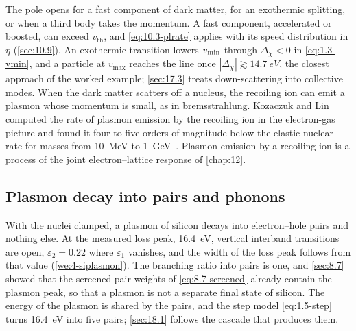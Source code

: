 The pole opens for a fast component of dark matter, for an exothermic splitting, or when a third body takes the momentum. A fast component, accelerated or boosted, can exceed $v_{\mathrm{th}}$, and \cref{eq:10.3-plrate} applies with its speed distribution in $\eta$ (\cref{sec:10.9}). An exothermic transition lowers $v_{\mathrm{min}}$ through $\Delta_\chi < 0$ in \cref{eq:1.3-vmin}, and a particle at $v_{\mathrm{max}}$ reaches the line once $|\Delta_\chi| \gtrsim \SI{14.7}{eV}$, the closest approach of the worked example; \cref{sec:17.3} treats down-scattering into collective modes. When the dark matter scatters off a nucleus, the recoiling ion can emit a plasmon whose momentum is small, as in bremsstrahlung. Kozaczuk and Lin computed the rate of plasmon emission by the recoiling ion in the electron-gas picture and found it four to five orders of magnitude below the elastic nuclear rate for masses from \SI{10}{MeV} to \SI{1}{GeV}~\cite{kozaczuk2020plasmon}. Plasmon emission by a recoiling ion is a process of the joint electron--lattice response of \cref{chap:12}.

\subsection{Plasmon decay into pairs and phonons}\label{sec:10.3-decay}

With the nuclei clamped, a plasmon of silicon decays into electron--hole pairs and nothing else. At the measured loss peak, \SI{16.4}{eV}, vertical interband transitions are open, $\varepsilon_2 = 0.22$ where $\varepsilon_1$ vanishes, and the width of the loss peak follows from that value (\cref{we:4-siplasmon}). The branching ratio into pairs is one, and \cref{sec:8.7} showed that the screened pair weights of \cref{eq:8.7-screened} already contain the plasmon peak, so that a plasmon is not a separate final state of silicon. The energy of the plasmon is shared by the pairs, and the step model \cref{eq:1.5-step} turns \SI{16.4}{eV} into five pairs; \cref{sec:18.1} follows the cascade that produces them.


